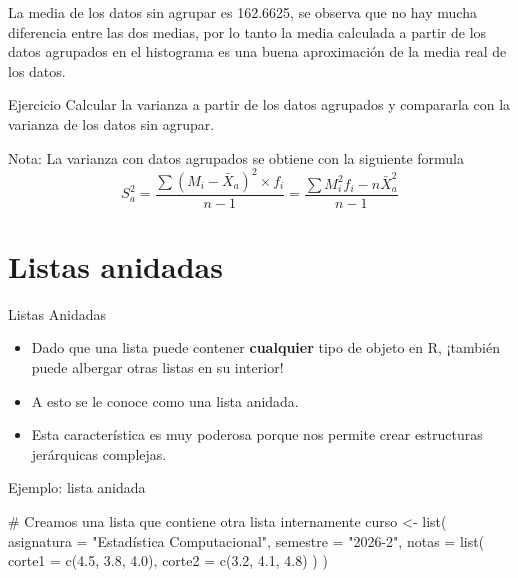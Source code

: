 \documentclass[
  ignorenonframetext,
  aspectratio=169,
  spanish,
]{beamer}
\newenvironment{Shaded}{\begin{snugshade}}{\end{snugshade}}
\newcommand{\AttributeTok}[1]{\textcolor[rgb]{0.40,0.45,0.13}{#1}}
\newcommand{\CommentTok}[1]{\textcolor[rgb]{0.37,0.37,0.37}{#1}}
\newcommand{\FloatTok}[1]{\textcolor[rgb]{0.68,0.00,0.00}{#1}}
\newcommand{\FunctionTok}[1]{\textcolor[rgb]{0.28,0.35,0.67}{#1}}
\newcommand{\NormalTok}[1]{\textcolor[rgb]{0.00,0.23,0.31}{#1}}
\newcommand{\OtherTok}[1]{\textcolor[rgb]{0.00,0.23,0.31}{#1}}
\newcommand{\StringTok}[1]{\textcolor[rgb]{0.13,0.47,0.30}{#1}}
\begin{document}
\begin{frame}{}
\label{section}
La media de los datos sin agrupar es 162.6625, se observa que no hay
mucha diferencia entre las dos medias, por lo tanto la media calculada a
partir de los datos agrupados en el histograma es una buena aproximación
de la media real de los datos.
\end{frame}

\begin{frame}{Ejercicio}
\label{ejercicio-2}
Calcular la varianza a partir de los datos agrupados y compararla con la
varianza de los datos sin agrupar.

Nota: La varianza con datos agrupados se obtiene con la siguiente
formula
\[S^2_a=\frac{\sum(M_i-\bar X_a)^2\times f_i }{n-1}=\frac{\sum M^2_if_i-n\bar X_a^2}{n-1}\]
\end{frame}

\section{Listas anidadas}\label{listas-anidadas}

\begin{frame}{Listas Anidadas}
\label{listas-anidadas-1}
\begin{itemize}
\item
  Dado que una lista puede contener \textbf{cualquier} tipo de objeto en
  R, ¡también puede albergar otras listas en su interior!
\item
  A esto se le conoce como una lista anidada.
\item
  Esta característica es muy poderosa porque nos permite crear
  estructuras jerárquicas complejas.
\end{itemize}
\end{frame}

\begin{frame}[fragile]{Ejemplo: lista anidada}
\label{ejemplo-lista-anidada}
\begin{Shaded}
\begin{Highlighting}[]
\CommentTok{\# Creamos una lista que contiene otra lista internamente}
\NormalTok{curso }\OtherTok{\textless{}{-}} \FunctionTok{list}\NormalTok{(}
  \AttributeTok{asignatura =} \StringTok{"Estadística Computacional"}\NormalTok{,}
  \AttributeTok{semestre =} \StringTok{"2026{-}2"}\NormalTok{,}
  \AttributeTok{notas =} \FunctionTok{list}\NormalTok{(}
    \AttributeTok{corte1 =} \FunctionTok{c}\NormalTok{(}\FloatTok{4.5}\NormalTok{, }\FloatTok{3.8}\NormalTok{, }\FloatTok{4.0}\NormalTok{),}
    \AttributeTok{corte2 =} \FunctionTok{c}\NormalTok{(}\FloatTok{3.2}\NormalTok{, }\FloatTok{4.1}\NormalTok{, }\FloatTok{4.8}\NormalTok{)}
\NormalTok{  )}
\NormalTok{)}
\end{Highlighting}
\end{Shaded}
\end{frame}
\end{document}
